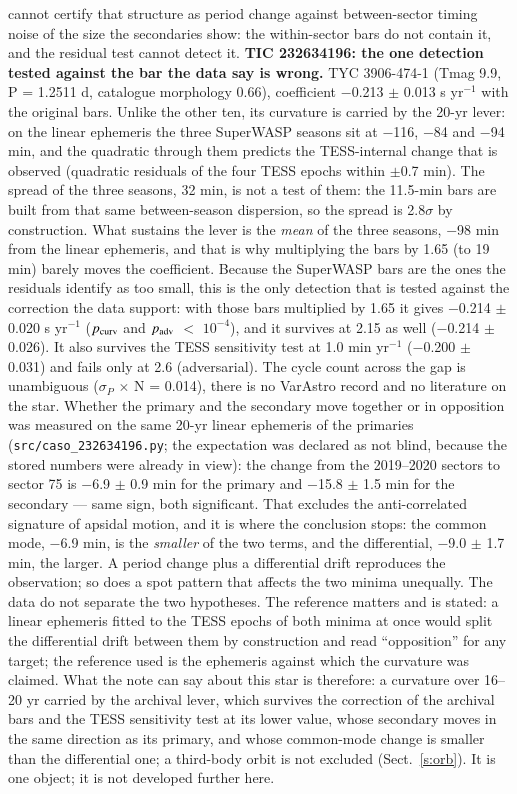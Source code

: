 \documentclass{aa}
\begin{document}
cannot certify that structure as period change against between-sector timing noise of the size the secondaries show: the within-sector bars do not contain it, and the residual test cannot detect it.
\textbf{TIC 232634196: the one detection tested against the bar the data say is wrong.} TYC 3906-474-1 (Tmag 9.9, P = 1.2511 d, catalogue morphology 0.66), coefficient $-$0.213 $\pm$ 0.013 s yr$^{-1}$ with the original bars. Unlike the other ten, its curvature is carried by the 20-yr lever: on the linear ephemeris the three SuperWASP seasons sit at $-$116, $-$84 and $-$94 min, and the quadratic through them predicts the TESS-internal change that is observed (quadratic residuals of the four TESS epochs within $\pm$0.7 min). The spread of the three seasons, 32 min, is not a test of them: the 11.5-min bars are built from that same between-season dispersion, so the spread is 2.8$\sigma$ by construction. What sustains the lever is the \emph{mean} of the three seasons, $-$98 min from the linear ephemeris, and that is why multiplying the bars by 1.65 (to 19 min) barely moves the coefficient. Because the SuperWASP bars are the ones the residuals identify as too small, this is the only detection that is tested against the correction the data support: with those bars multiplied by 1.65 it gives $-$0.214 $\pm$ 0.020 s yr$^{-1}$ ($p_{\rm curv}$ and $p_{\rm adv}$ $<$ $10^{-4}$), and it survives at 2.15 as well ($-$0.214 $\pm$ 0.026). It also survives the TESS sensitivity test at 1.0 min yr$^{-1}$ ($-$0.200 $\pm$ 0.031) and fails only at 2.6 (adversarial). The cycle count across the gap is unambiguous ($\sigma_P$ $\times$ N = 0.014), there is no VarAstro record and no literature on the star. Whether the primary and the secondary move together or in opposition was measured on the same 20-yr linear ephemeris of the primaries (\texttt{src/caso\_232634196.py}; the expectation was declared as not blind, because the stored numbers were already in view): the change from the 2019--2020 sectors to sector 75 is $-$6.9 $\pm$ 0.9 min for the primary and $-$15.8 $\pm$ 1.5 min for the secondary --- same sign, both significant. That excludes the anti-correlated signature of apsidal motion, and it is where the conclusion stops: the common mode, $-$6.9 min, is the \emph{smaller} of the two terms, and the differential, $-$9.0 $\pm$ 1.7 min, the larger. A period change plus a differential drift reproduces the observation; so does a spot pattern that affects the two minima unequally. The data do not separate the two hypotheses. The reference matters and is stated: a linear ephemeris fitted to the TESS epochs of both minima at once would split the differential drift between them by construction and read ``opposition'' for any target; the reference used is the ephemeris against which the curvature was claimed. What the note can say about this star is therefore: a curvature over 16--20 yr carried by the archival lever, which survives the correction of the archival bars and the TESS sensitivity test at its lower value, whose secondary moves in the same direction as its primary, and whose common-mode change is smaller than the differential one; a third-body orbit is not excluded (Sect.~\ref{s:orb}). It is one object; it is not developed further here.
\end{document}
